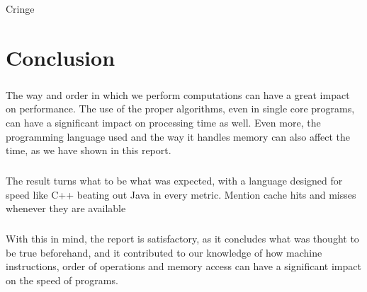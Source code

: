 \documentclass{report}
\begin{document}
    \paragraph{}Cringe

    \chapter{Conclusion}

    \paragraph{}The way and order in which we perform computations can have a great impact on performance. The use of the proper algorithms, even in single core programs, can have a significant impact on processing time as well. Even more, the programming language used and the way it handles memory can also affect the time, as we have shown in this report.

    \paragraph{}The result turns what to be what was expected, with a language designed for speed like C++ beating out Java in every metric. Mention cache hits and misses whenever they are available

    \paragraph{}With this in mind, the report is satisfactory, as it concludes what was thought to be true beforehand, and it contributed to our knowledge of how machine instructions, order of operations and memory access can have a significant impact on the speed of programs.
\end{document}
